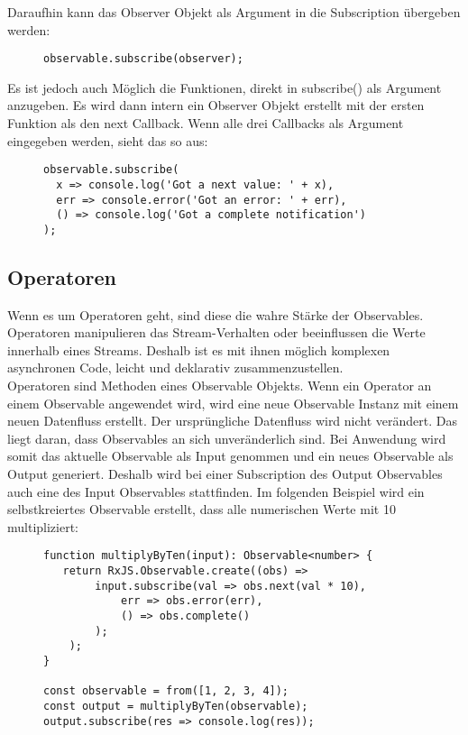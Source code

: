 \noindent
Daraufhin kann das Observer Objekt als Argument in die Subscription übergeben werden:

\begin{figure}[H]
\begin{lstlisting}[basicstyle=\small]
observable.subscribe(observer);
\end{lstlisting}
\end{figure}

\noindent
Es ist jedoch auch Möglich die Funktionen, direkt in subscribe() als Argument anzugeben. Es wird dann intern ein Observer Objekt erstellt mit der ersten Funktion als den next Callback. Wenn alle drei Callbacks als Argument eingegeben werden, sieht das so aus:

\begin{figure}[H]
\begin{lstlisting}[basicstyle=\small]
observable.subscribe(
  x => console.log('Got a next value: ' + x),
  err => console.error('Got an error: ' + err),
  () => console.log('Got a complete notification')
);
\end{lstlisting}
\end{figure}

\subsection{Operatoren}
Wenn es um Operatoren geht, sind diese die wahre Stärke der Observables. Operatoren manipulieren das Stream-Verhalten oder beeinflussen die Werte innerhalb eines Streams. Deshalb ist es mit ihnen möglich komplexen asynchronen Code, leicht und deklarativ zusammenzustellen.\\

\noindent
Operatoren sind Methoden eines Observable Objekts. Wenn ein Operator an einem Observable angewendet wird, wird eine neue Observable Instanz mit einem neuen Datenfluss erstellt. Der ursprüngliche Datenfluss wird nicht verändert. Das liegt daran, dass Observables an sich unveränderlich sind. Bei Anwendung wird somit das aktuelle Observable als Input genommen und ein neues Observable als Output generiert. Deshalb wird bei einer Subscription des Output Observables auch eine des Input Observables stattfinden. Im folgenden Beispiel wird ein selbstkreiertes Observable erstellt, dass alle numerischen Werte mit 10 multipliziert:

\begin{figure}[H]
\begin{lstlisting}[basicstyle=\small]
function multiplyByTen(input): Observable<number> {
   return RxJS.Observable.create((obs) =>
        input.subscribe(val => obs.next(val * 10),
            err => obs.error(err),
            () => obs.complete()
        );
    );
}

const observable = from([1, 2, 3, 4]);
const output = multiplyByTen(observable);
output.subscribe(res => console.log(res));
\end{lstlisting}
\end{figure}

